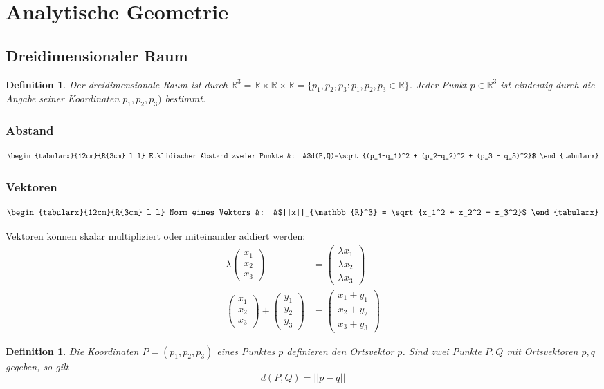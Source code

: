 \documentclass[12pt,a4paper]{article}%
\newtheorem{definition}[satz]{Definition}
\numberwithin{equation}{section}
\newcommand{\R}{\mathbb{R}} %
\def\vecT#1{\left(\begin{array}{c} #1 \end{array}\right)}
\def\formTab#1#2{
\begin{equation}
  \begin{tabularx}{12cm}{R{3cm} l l}
    #1 &: &$#2$
  \end{tabularx}
\end{equation}
}
\numberwithin{equation}{subsection}
\begin{document}
\section{Analytische Geometrie}
  \subsection{Dreidimensionaler Raum}
  \begin{definition}
    Der dreidimensionale Raum ist durch $\R^3 = \R \times \R \times \R = \lbrace p_1, p_2, p_3: p_1, p_2, p_3 \in \R \rbrace$. Jeder Punkt $p\in \R^3$ ist eindeutig durch die Angabe seiner Koordinaten $p_1, p_2, p_3)$ bestimmt.
  \end{definition}
  \subsubsection{Abstand}
  \formTab{Euklidischer Abstand zweier Punkte}{d(P,Q)=\sqrt{(p_1-q_1)^2 + (p_2-q_2)^2 + (p_3 - q_3)^2}} 
  \subsubsection{Vektoren} 
  \formTab{Norm eines Vektors}{||x||_{\R^3} = \sqrt{x_1^2 + x_2^2 + x_3^2}}
  Vektoren können skalar multipliziert oder miteinander addiert werden:
  \begin{align}
    \lambda \vecT{x_1 \\ x_2 \\ x_3} &= \vecT{\lambda x_1 \\ \lambda x_2 \\ \lambda x_3}\\
    \vecT{x_1 \\ x_2 \\ x_3} + \vecT{y_1 \\ y_2 \\ y_3} &= \vecT{x_1 + y_1 \\ x_2 + y_2 \\ x_3 + y_3}
  \end{align}   
  \begin{definition}
    Die Koordinaten $P = (p_1, p_2, p_3)$ eines Punktes $p$ definieren den Ortsvektor $p$. Sind zwei Punkte $P,Q$ mit Ortsvektoren $p,q$ gegeben, so gilt 
    \begin{equation}
      d(P,Q) = ||p-q||
    \end{equation}   
  \end{definition}  
    
\end{document}
